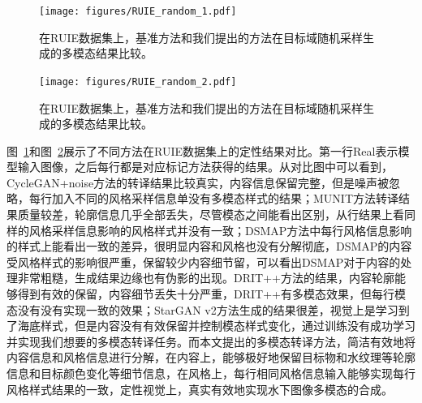 \begin{figure}[htp]
    \centering
	\texttt{[image: figures/RUIE\_random\_1.pdf]}
	\caption{在RUIE数据集上，基准方法和我们提出的方法在目标域随机采样生成的多模态结果比较。}
	\label{fig:ruie_random_1}
\end{figure}

\begin{figure}[htp]
    \centering
	\texttt{[image: figures/RUIE\_random\_2.pdf]}
	\caption{在RUIE数据集上，基准方法和我们提出的方法在目标域随机采样生成的多模态结果比较。}
	\label{fig:ruie_random_2}
\end{figure}

图~\ref{fig:ruie_random_1}和图~\ref{fig:ruie_random_2}展示了不同方法在RUIE数据集上的定性结果对比。第一行Real表示模型输入图像，之后每行都是对应标记方法获得的结果。从对比图中可以看到，CycleGAN+noise方法的转译结果比较真实，内容信息保留完整，但是噪声被忽略，每行加入不同的风格采样信息单没有多模态样式的结果；MUNIT方法转译结果质量较差，轮廓信息几乎全部丢失，尽管模态之间能看出区别，从行结果上看同样的风格采样信息影响的风格样式并没有一致；DSMAP方法中每行风格信息影响的样式上能看出一致的差异，很明显内容和风格也没有分解彻底，DSMAP的内容受风格样式的影响很严重，保留较少内容细节留，可以看出DSMAP对于内容的处理非常粗糙，生成结果边缘也有伪影的出现。DRIT++方法的结果，内容轮廓能够得到有效的保留，内容细节丢失十分严重，DRIT++有多模态效果，但每行模态没有没有实现一致的效果；StarGAN v2方法生成的结果很差，视觉上是学习到了海底样式，但是内容没有有效保留并控制模态样式变化，通过训练没有成功学习并实现我们想要的多模态转译任务。而本文提出的多模态转译方法，简洁有效地将内容信息和风格信息进行分解，在内容上，能够极好地保留目标物和水纹理等轮廓信息和目标颜色变化等细节信息，在风格上，每行相同风格信息输入能够实现每行风格样式结果的一致，定性视觉上，真实有效地实现水下图像多模态的合成。

